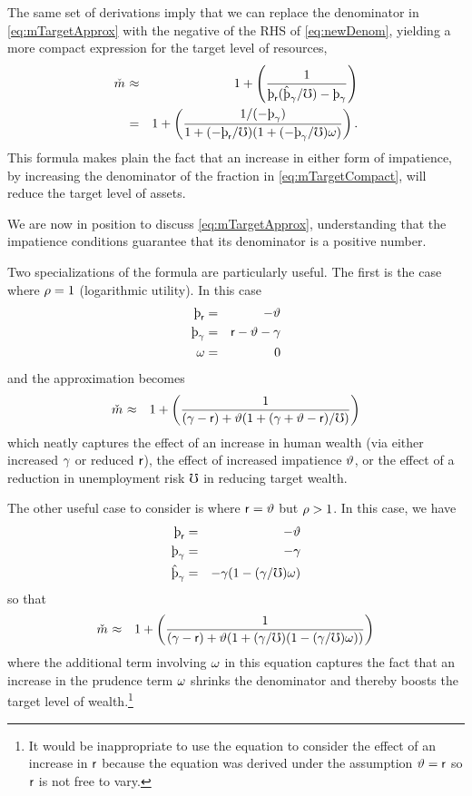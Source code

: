 \documentclass{handout}
\begin{document}
The same set of derivations imply that we can
replace the denominator in \eqref{eq:mTargetApprox} with the negative
of the RHS of \eqref{eq:newDenom}, yielding a more compact expression
for the target level of resources,
\begin{eqnarray}
 \mTarg^{\null} & \approx & 1 + \left(\frac{1}{\patr(\patpGrohat/\urate) - \patpGro }\right)
\\ & = & 1 + \left(\frac{1/(-\patpGro)}{1+(-\patr/\urate)(1+(-\patpGro/\urate)\prudEx)  }\right) \label{eq:mTargetCompact}
.
\end{eqnarray}
This formula makes plain the fact that an
increase in either form of impatience, by increasing the denominator of the 
fraction in 
\eqref{eq:mTargetCompact}, will reduce the target level of assets.

We are now in position to discuss \eqref{eq:mTargetApprox}, understanding that the
impatience conditions guarantee that its denominator is a positive number.

Two specializations of the formula are particularly useful.  The first is
the case where $\rho = 1$ (logarithmic utility).  In this case
\begin{eqnarray}
    \patr & = & -\timeRate
\\  \patpGro & = & \rfree-\timeRate-\pGro
\\  \prudEx & = & 0
\end{eqnarray}
and the approximation becomes
\begin{eqnarray}
 \mTarg^{\null} & \approx & 1 + \left(\frac{1}{(\pGro-\rfree)+\timeRate(1+(\pGro+\timeRate-\rfree)/\urate)}\right)
\end{eqnarray}
which neatly captures the effect of an increase in human wealth (via either increased $\gamma$ or reduced $\mathsf{r}$), the effect of increased impatience $\vartheta$,
or the effect of a reduction in unemployment risk $\mho$ in reducing target wealth.


The other useful case to consider is where $\mathsf{r} = \vartheta$ but $\rho>1$.  In this case, we have
\begin{eqnarray}
    \patr & = & -\timeRate
\\  \patpGro & = & -\pGro
\\  \patpGrohat & = & -\pGro (1-(\pGro/\urate)\prudEx)
\end{eqnarray}
so that
\begin{eqnarray}
 \mTarg^{\null} & \approx & 1 + \left(\frac{1}{(\pGro-\rfree)+\timeRate(1+(\pGro/\urate)(1-(\pGro/\urate)\prudEx))}\right)
\end{eqnarray}
where the additional term involving $\omega$ in this equation
captures the fact that an increase in the prudence term $\omega$
shrinks the denominator and thereby boosts the target level of
wealth.\footnote{It would be inappropriate to use the equation to
  consider the effect of an increase in $\mathsf{r}$ because the equation was derived under the
  assumption $\vartheta=\mathsf{r}$ so $\mathsf{r}$ is not free to vary.}
\end{document}
